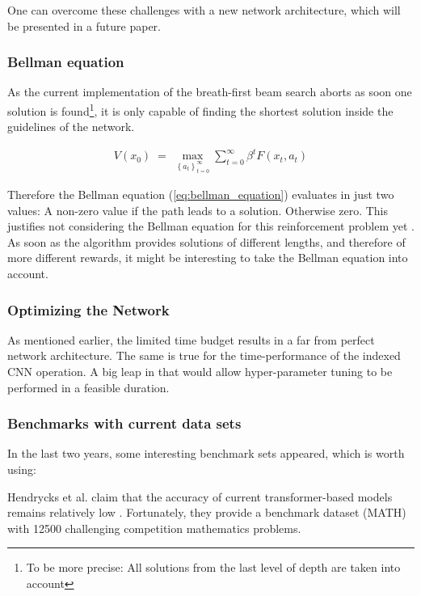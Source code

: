 \documentclass{scrartcl}
\theoremstyle{definition}
\begin{document}
One can overcome these challenges with a new network architecture, which will be presented in a future paper.

\subsubsection{Bellman equation}

As the current implementation of the breath-first beam search aborts as soon one solution is found\footnote{To be more precise: All solutions from the last level of depth are taken into account},
it is only capable of finding the shortest solution inside the guidelines of the network. 

\begin{align}
	V(x_{0})\;=\;\max _{\left\{a_{t}\right\}_{t=0}^{\infty }}\sum _{t=0}^{\infty }\beta ^{t}F(x_{t},a_{t})
	\label{eq:bellman_equation}
\end{align}

Therefore the Bellman equation (\ref{eq:bellman_equation}) evaluates in just two values:
A non-zero value if the path leads to a solution. Otherwise zero.
This justifies not considering the Bellman equation for this reinforcement problem yet \cite{bellman}.
As soon as the algorithm provides solutions of different lengths, and therefore of more different rewards, it might be interesting to take the Bellman equation into account.


\subsubsection{Optimizing the Network}

As mentioned earlier, the limited time budget results in a far from perfect network architecture.
The same is true for the time-performance of the indexed CNN operation.
A big leap in that would allow hyper-parameter tuning to be performed in a feasible duration.

\subsubsection{Benchmarks with current data sets}

In the last two years, some interesting benchmark sets appeared, which is worth using:

Hendrycks et al. claim that the accuracy of current transformer-based models remains relatively low \cite{hendrycks2021measuring}.
Fortunately, they provide a benchmark dataset (MATH) with 12500 challenging competition mathematics problems.
\end{document}
